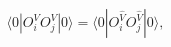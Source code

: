 \begin{equation}
 \label{hol2}
 \langle 0| O_i^V O_j^V |0\rangle = \langle 0|
  O_i^{\widehat{V}}O_j^{\widehat{V}} |0\rangle,
\end{equation}

